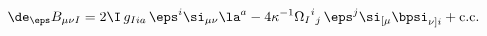 \begin{equation} \label{de_B_loc}
  \de_\eps B_{\mu\nu I} = 2\I\, g_{Iia}\, \eps^i \si_{\mu\nu} \la^a
  - 4 \kappa^{-1} {\Omega_I}^i{}_j\, \eps^j \si_{[\mu} \bpsi_{\nu]i}
  + \text{c.c.}
 \end{equation}

